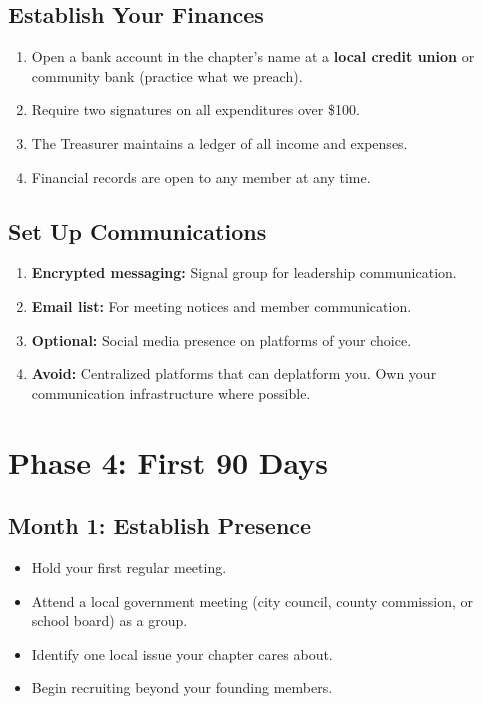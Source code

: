 \documentclass[11pt, letterpaper]{article}
\begin{document}
\subsection{Establish Your Finances}
\begin{enumerate}
  \item Open a bank account in the chapter's name at a \textbf{local credit union} or community bank (practice what we preach).
  \item Require two signatures on all expenditures over \$100.
  \item The Treasurer maintains a ledger of all income and expenses.
  \item Financial records are open to any member at any time.
\end{enumerate}

\subsection{Set Up Communications}
\begin{enumerate}
  \item \textbf{Encrypted messaging:} Signal group for leadership communication.
  \item \textbf{Email list:} For meeting notices and member communication.
  \item \textbf{Optional:} Social media presence on platforms of your choice.
  \item \textbf{Avoid:} Centralized platforms that can deplatform you. Own your communication infrastructure where possible.
\end{enumerate}


\section{Phase 4: First 90 Days}

\subsection{Month 1: Establish Presence}
\begin{itemize}
  \item Hold your first regular meeting.
  \item Attend a local government meeting (city council, county commission, or school board) as a group.
  \item Identify one local issue your chapter cares about.
  \item Begin recruiting beyond your founding members.
\end{itemize}
\end{document}
